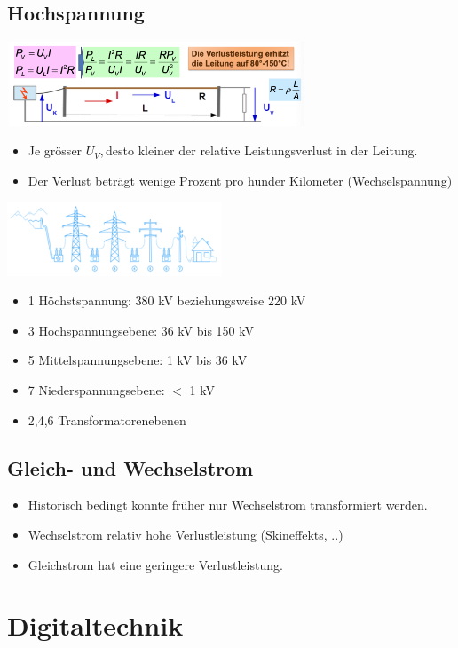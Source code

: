 \documentclass[8pt,a4paper]{scrartcl}
\begin{document}
\begin{multicols*}{3}
		\subsection{Hochspannung}
			\includegraphics[height=2.5cm]{img/hochspannung1.png} 
			\begin{itemize}\itemsep0pt
				\item Je grösser $U_{V}, $desto kleiner der relative Leistungsverlust in der Leitung.
				\item Der Verlust beträgt wenige Prozent pro hunder Kilometer (Wechselspannung)
			\end{itemize}
			\includegraphics[height=2.2cm]{img/hochspannung2.png} 
			\begin{itemize}\itemsep0pt
				\item 1 Höchstspannung: 380 kV beziehungsweise 220 kV 
				\item 3 Hochspannungsebene: 36 kV bis 150 kV
				\item 5 Mittelspannungsebene: 1 kV bis 36 kV
				\item 7 Niederspannungsebene: $<$ 1 kV 
				\item 2,4,6 Transformatorenebenen 
			\end{itemize}
		\subsection{Gleich- und Wechselstrom}
			\begin{itemize}\itemsep0pt
				\item Historisch bedingt konnte früher nur Wechselstrom transformiert werden. 
				\item Wechselstrom relativ hohe Verlustleistung (Skineffekts, ..)
				\item Gleichstrom hat eine geringere Verlustleistung.
			\end{itemize}

		\section{Digitaltechnik}

\end{multicols*}
\end{document}
